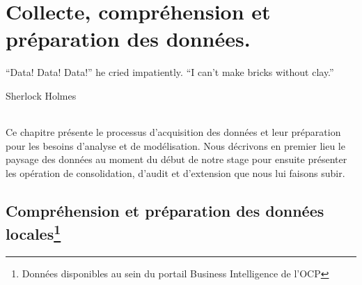 \chapter{Collecte, compréhension et préparation des données.}
\epigraph{“Data! Data! Data!” he cried impatiently. “I can’t make bricks without clay.”}{Sherlock Holmes}
\subparagraph{}
Ce chapitre présente le processus d'acquisition des données et leur préparation pour les besoins d'analyse et de modélisation. Nous décrivons en premier lieu le paysage des données au moment du début de notre stage pour ensuite présenter les opération de consolidation, d'audit et d'extension que nous lui faisons subir.
\cleardoublepage
\newcommand{\reels}{\mathbb{R}}
	\section{Compréhension et préparation des données locales\protect\footnote{Données disponibles au sein du portail Business Intelligence de l'OCP}}
